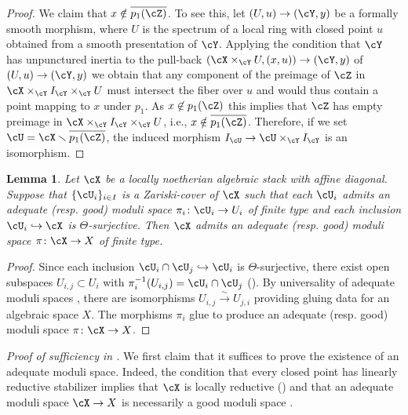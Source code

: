 \documentclass[a4paper]{amsart}
\numberwithin{equation}{section}
\theoremstyle{plain}
\newtheorem{lem}[thm]{Lemma}
\theoremstyle{definition}
\newcommand{\hookarr}{\hookrightarrow}
\newcommand{\co}{\colon}
\newcommand{\iso}{\stackrel{\sim}{\to}}
\begin{document}
\begin{proof}
{We claim that $x \notin \overline{p_1(\cZ)}$. To see this, let $(U, u) \to (\cY,y) $ be a formally smooth morphism, where $U$ is the spectrum of a local ring with closed point $u$ obtained from a smooth presentation of $\cY$. {Applying the condition that $\cY$ has unpunctured inertia to the pull-back $(\cX\times_{\cY} U,(x,u)) \to (\cY,y)$ of $(U,u)\to (\cY,y)$ we obtain that} any component of the preimage of $\cZ$ in $\cX \times_{\cY} I_{\cY} \times_{\cY} U$ must intersect the fiber over $u$ and would thus contain a point mapping to $x$ under $p_1$. As $x\not \in p_1(\cZ)$ this implies that $\cZ$ has empty preimage in $\cX \times_{\cY} I_{\cY} \times_{\cY} U$, i.e., $x \notin \overline{p_1(\cZ)}$.  Therefore,  if we set $\cU = \cX \smallsetminus \overline{p_1(\cZ)}$, the induced morphism $I_{\cU} \to \cU \times_{\cY} I_{\cY}$ is an isomorphism.}
\end{proof}

\begin{lem} \label{L:glue} Let $\cX$ be a locally noetherian algebraic stack with affine diagonal. Suppose that $\{\cU_i\}_{i \in I}$ is a Zariski-cover of $\cX$ such that each $\cU_i$ admits an adequate (resp. good) moduli space $\pi_i \co \cU_i \to U_i$ of finite type and each inclusion $\cU_i \hookarr \cX$ is $\Theta$-surjective.  Then $\cX$ admits an adequate (resp. good) moduli space $\pi \co \cX \to X$ of finite type.
\end{lem}

\begin{proof}
	Since each inclusion $\cU_i \cap \cU_j \hookarr \cU_i$ is $\Theta$-surjective, there exist open subspaces $U_{i,j} \subset U_i$ with $\pi_i^{-1}(U_{i,j}) = \cU_i \cap \cU_j$ ().  By universality of adequate moduli spaces \cite[Thm.~3.12]{ahr2}, there are isomorphisms $U_{i,j} \iso U_{j,i}$ providing gluing data for an algebraic space $X$.  The morphisms $\pi_i$ glue to produce an adequate (resp. good) moduli space $\pi \co \cX \to X$.
\end{proof}

\medskip

\noindent
\emph{Proof of sufficiency in .}  
	We first claim that it suffices to prove the existence of an adequate moduli space.  Indeed, the condition that every closed point has linearly reductive stabilizer implies that $\cX$ is locally reductive () and that an adequate moduli space $\cX \to X$ is necessarily a good moduli space \cite[Thm.~9.3]{ahr2}.  
\end{document}
